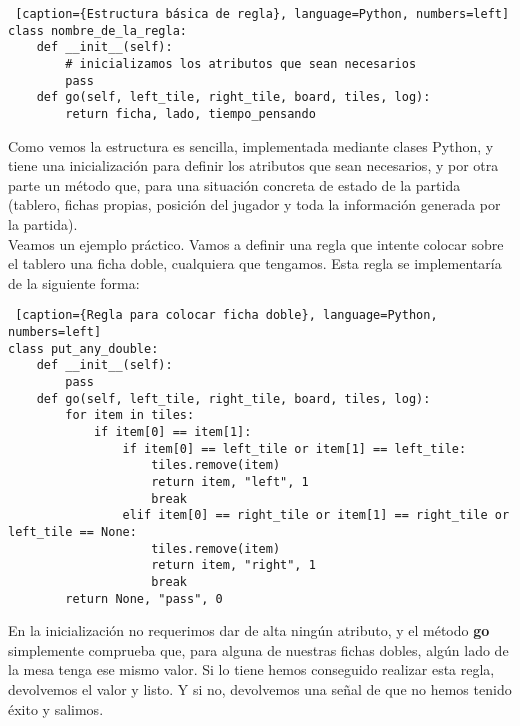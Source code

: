 \begin{lstlisting} [caption={Estructura básica de regla}, language=Python, numbers=left]
class nombre_de_la_regla:
    def __init__(self):
        # inicializamos los atributos que sean necesarios
        pass
    def go(self, left_tile, right_tile, board, tiles, log):
        return ficha, lado, tiempo_pensando
\end{lstlisting}

Como vemos la estructura es sencilla, implementada mediante clases Python, y tiene una inicialización para definir los
atributos que sean necesarios, y por otra parte un método que, para una situación concreta de estado de la partida
(tablero, fichas propias, posición del jugador y toda la información generada por la partida). \\

Veamos un ejemplo práctico. Vamos a definir una regla que intente colocar sobre el tablero una ficha doble, cualquiera
que tengamos. Esta regla se implementaría de la siguiente forma:

\begin{lstlisting} [caption={Regla para colocar ficha doble}, language=Python, numbers=left]
class put_any_double:
    def __init__(self):
        pass
    def go(self, left_tile, right_tile, board, tiles, log):
        for item in tiles:
            if item[0] == item[1]:
                if item[0] == left_tile or item[1] == left_tile:
                    tiles.remove(item)
                    return item, "left", 1
                    break
                elif item[0] == right_tile or item[1] == right_tile or left_tile == None:
                    tiles.remove(item)
                    return item, "right", 1
                    break
        return None, "pass", 0
\end{lstlisting}

En la inicialización no requerimos dar de alta ningún atributo, y el método \textbf{go} simplemente comprueba que, para
alguna de nuestras fichas dobles, algún lado de la mesa tenga ese mismo valor. Si lo tiene hemos conseguido realizar
esta regla, devolvemos el valor y listo. Y si no, devolvemos una señal de que no hemos tenido éxito y salimos. \\


